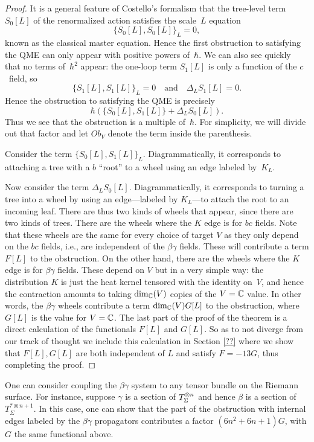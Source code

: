 \begin{proof}
It is a general feature of Costello's formalism that the tree-level term $S_0[L]$ of the renormalized action satisfies the scale~$L$ equation
\[
\{S_0[L],S_0[L]\}_L = 0,
\]
known as the classical master equation.
Hence the first obstruction to satisfying the QME can only appear with positive powers of~$\hbar$.
We can also see quickly that no terms of~$\hbar^2$ appear:
the one-loop term $S_1[L]$ is only a function of the $c$~field, 
so 
\[
\{S_1[L],S_1[L]\}_L = 0 \quad\text{and}\quad \Delta_L S_1[L] = 0.
\]
Hence the obstruction to satisfying the QME is precisely
\[
\hbar\left( \{S_0[L],S_1[L]\} + \Delta_L S_0[L] \right).
\]
Thus we see that the obstruction is a multiple of~$\hbar$.
For simplicity, we will divide out that factor and let $Ob_V$ denote the term inside the parenthesis.

Consider the term $\{S_0[L],S_1[L]\}_L$. 
Diagrammatically, it corresponds to attaching a tree with a $b$ ``root'' to a wheel using an edge labeled by~$K_L$.

Now consider the term $\Delta_L S_0[L]$. 
Diagrammatically, it corresponds to turning a tree into a wheel by using an edge---labeled by $K_L$---to attach the root to an incoming leaf.
There are thus two kinds of wheels that appear, since there are two kinds of trees.
There are the wheels where the $K$ edge is for $bc$ fields.
Note that these wheels are the same for every choice of target $V$
as they only depend on the $bc$ fields, i.e., are independent of the $\beta\gamma$ fields.
These will contribute a term $F[L]$ to the obstruction.
On the other hand, there are the wheels where the $K$ edge is for $\beta\gamma$ fields.
These depend on $V$ but in a very simple way: 
the distribution $K$ is just the heat kernel tensored with the identity on~$V$, 
and hence the contraction amounts to taking $\dim_\mathbb C(V)$ copies of the $V = \mathbb C$ value.
In other words, the $\beta\gamma$ wheels contribute a term $\dim_\mathbb C(V) G[L]$ to the obstruction,
where $G[L]$ is the value for $V = \mathbb C$.
The last part of the proof of the theorem is a direct calculation of the functionals $F[L]$ and $G[L]$. 
So as to not diverge from our track of thought we include this calculation in Section \ref{??} where we show that $F[L], G[L]$ are both independent of $L$ and satisfy $F = -13 G$, thus completing the proof.
\end{proof}

\begin{rmk} One can consider coupling the $\beta\gamma$ system to any tensor bundle on the Riemann surface. 
For instance, suppose $\gamma$ is a section of $T_\Sigma^{\otimes n}$ and hence $\beta$ is a section of $T^{* \otimes {n+1}}_\Sigma$.
In this case, one can show that the part of the obstruction with internal edges labeled by the $\beta\gamma$ propagators contributes a factor $(6n^2 + 6n + 1)G$, with $G$ the same functional above. 
\end{rmk}





